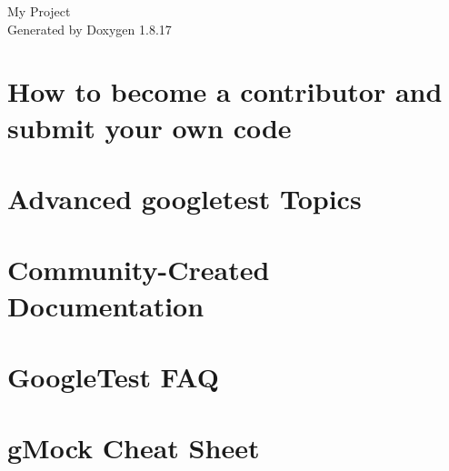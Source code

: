 \let\mypdfximage\pdfximage\def\pdfximage{\immediate\mypdfximage}\documentclass[twoside]{book}
\newcommand{\+}{\discretionary{\mbox{\scriptsize$\hookleftarrow$}}{}{}}
\newcommand{\clearemptydoublepage}{%
  \newpage{\pagestyle{empty}\cleardoublepage}%
}
\begin{document}
\hypersetup{pageanchor=false,
             bookmarksnumbered=true,
             pdfencoding=unicode
            }
\begin{titlepage}
\vspace*{7cm}
\begin{center}%
{\Large My Project }\\
\vspace*{1cm}
{\large Generated by Doxygen 1.8.17}\\
\end{center}
\end{titlepage}
\clearemptydoublepage
{}
\tableofcontents
\clearemptydoublepage
{}
\hypersetup{pageanchor=true}

\chapter{How to become a contributor and submit your own code}
\label{md_build_googletest-src_CONTRIBUTING}

\chapter{Advanced googletest Topics}
\label{md_build_googletest-src_docs_advanced}

\chapter{Community-\/\+Created Documentation}
\label{md_build_googletest-src_docs_community_created_documentation}

\chapter{Google\+Test F\+AQ}
\label{md_build_googletest-src_docs_faq}

\chapter{g\+Mock Cheat Sheet}
\label{md_build_googletest-src_docs_gmock_cheat_sheet}

\end{document}
